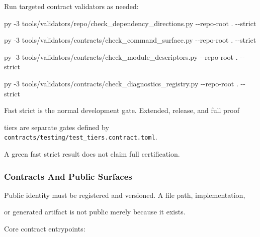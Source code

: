 \documentclass[9pt,a4paper,openany]{book}
\newcommand{\vonecode}[1]{\par\smallskip\noindent\begingroup\setlength{\fboxsep}{7pt}\colorbox{DomCodeBg}{\parbox{0.94\linewidth}{\footnotesize\ttfamily #1}}\endgroup\par\smallskip}
\begin{document}
Run targeted contract validators as needed:


\vonecode{py -\allowbreak{}3 tools/\allowbreak{}validators/\allowbreak{}repo/\allowbreak{}check\_\allowbreak{}dependency\_\allowbreak{}directions.\allowbreak{}py -\allowbreak{}-\allowbreak{}repo-\allowbreak{}root .\allowbreak{} -\allowbreak{}-\allowbreak{}strict\par
py -\allowbreak{}3 tools/\allowbreak{}validators/\allowbreak{}contracts/\allowbreak{}check\_\allowbreak{}command\_\allowbreak{}surface.\allowbreak{}py -\allowbreak{}-\allowbreak{}repo-\allowbreak{}root .\allowbreak{} -\allowbreak{}-\allowbreak{}strict\par
py -\allowbreak{}3 tools/\allowbreak{}validators/\allowbreak{}contracts/\allowbreak{}check\_\allowbreak{}module\_\allowbreak{}descriptors.\allowbreak{}py -\allowbreak{}-\allowbreak{}repo-\allowbreak{}root .\allowbreak{} -\allowbreak{}-\allowbreak{}strict\par
py -\allowbreak{}3 tools/\allowbreak{}validators/\allowbreak{}contracts/\allowbreak{}check\_\allowbreak{}diagnostics\_\allowbreak{}registry.\allowbreak{}py -\allowbreak{}-\allowbreak{}repo-\allowbreak{}root .\allowbreak{} -\allowbreak{}-\allowbreak{}strict\par}

Fast strict is the normal development gate.\allowbreak{} Extended, release, and full proof

tiers are separate gates defined by \texttt{contracts/\allowbreak{}testing/\allowbreak{}test\_\allowbreak{}tiers.\allowbreak{}contract.\allowbreak{}toml}.\allowbreak{}

A green fast strict result does not claim full certification.\allowbreak{}


\subsubsection{Contracts And Public Surfaces}

Public identity must be registered and versioned.\allowbreak{} A file path, implementation,

or generated artifact is not public merely because it exists.\allowbreak{}


Core contract entrypoints:
\end{document}
